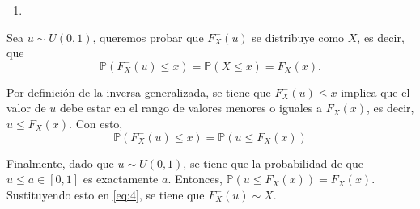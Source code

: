 \newpage
{\color{blue}
	\begin{enumerate}[label=\alph*), start=2]
		\item  
\end{enumerate}}
Sea $u\sim U(0,1)$, queremos probar que $F_{X}^{-}(u)$ se distribuye como $X$, es decir, que
\begin{equation}
	\mathbb{P} \left(F_{X}^{-}(u) \leq x\right) = \mathbb{P}\left(X\leq x\right) = F_{X}(x).
\end{equation}

Por definición de la inversa generalizada, se tiene que $F_{X}^{-}(u) \leq x$ implica que el valor de $u$ debe estar en el rango de valores menores o iguales a  $F_{X}(x)$, es decir, $u\leq F_{X}(x)$. Con esto,
\begin{equation} \label{eq:4}
	\mathbb{P} \left(F_{X}^{-}(u) \leq x\right) = \mathbb{P}\left(u\leq F_{X}(x)\right)
\end{equation}

Finalmente, dado que $u\sim U(0,1)$, se tiene que la probabilidad de que $u\leq a\in[0,1]$ es exactamente $a$. Entonces, $\mathbb{P}\left(u\leq F_{X}(x)\right) = F_{X}(x)$. Sustituyendo esto en \eqref{eq:4}, se tiene que $F_{X}^{-}(u)\sim X$.